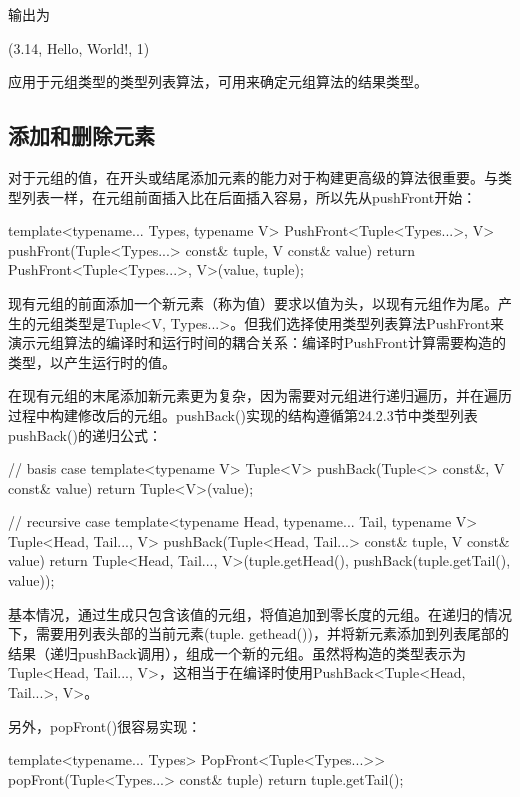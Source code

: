 输出为

\begin{shell}
(3.14, Hello, World!, 1)
\end{shell}

应用于元组类型的类型列表算法，可用来确定元组算法的结果类型。

\subsection{添加和删除元素}

对于元组的值，在开头或结尾添加元素的能力对于构建更高级的算法很重要。与类型列表一样，在元组前面插入比在后面插入容易，所以先从pushFront开始：

\begin{cpp}
template<typename... Types, typename V>
PushFront<Tuple<Types...>, V>
pushFront(Tuple<Types...> const& tuple, V const& value)
{
	return PushFront<Tuple<Types...>, V>(value, tuple);
}
\end{cpp}

现有元组的前面添加一个新元素（称为值）要求以值为头，以现有元组作为尾。产生的元组类型是Tuple<V, Types...>。但我们选择使用类型列表算法PushFront来演示元组算法的编译时和运行时间的耦合关系：编译时PushFront计算需要构造的类型，以产生运行时的值。

在现有元组的末尾添加新元素更为复杂，因为需要对元组进行递归遍历，并在遍历过程中构建修改后的元组。pushBack()实现的结构遵循第24.2.3节中类型列表pushBack()的递归公式：

\begin{cpp}
// basis case
template<typename V>
Tuple<V> pushBack(Tuple<> const&, V const& value)
{
	return Tuple<V>(value);
}

// recursive case
template<typename Head, typename... Tail, typename V>
Tuple<Head, Tail..., V>
pushBack(Tuple<Head, Tail...> const& tuple, V const& value)
{
	return Tuple<Head, Tail..., V>(tuple.getHead(),
	pushBack(tuple.getTail(), value));
}
\end{cpp}

基本情况，通过生成只包含该值的元组，将值追加到零长度的元组。在递归的情况下，需要用列表头部的当前元素(tuple. gethead())，并将新元素添加到列表尾部的结果（递归pushBack调用），组成一个新的元组。虽然将构造的类型表示为Tuple<Head, Tail..., V>，这相当于在编译时使用PushBack<Tuple<Head, Tail...>, V>。

另外，popFront()很容易实现：

\begin{cpp}
template<typename... Types>
PopFront<Tuple<Types...>>
popFront(Tuple<Types...> const& tuple)
{
	return tuple.getTail();
}
\end{cpp}

